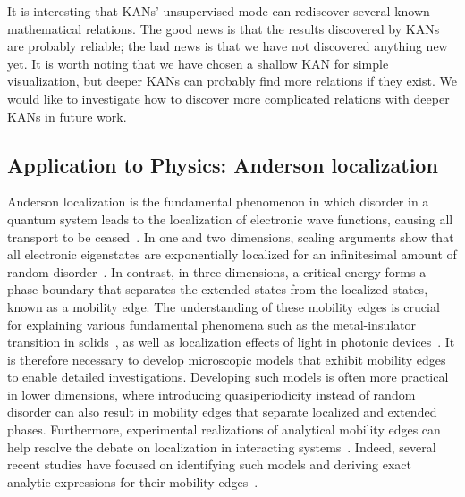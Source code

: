 \documentclass{article}
\numberwithin{equation}{section}
\numberwithin{figure}{section}
\begin{document}
It is interesting that KANs' unsupervised mode can rediscover several known mathematical relations. The good news is that the results discovered by KANs are probably reliable; the bad news is that we have not discovered anything new yet. It is worth noting that we have chosen a shallow KAN for simple visualization, but deeper KANs can probably find more relations if they exist. We would like to investigate how to discover more complicated relations with deeper KANs in future work. 

\subsection{Application to Physics: Anderson localization}\label{subsec:anderson}

Anderson localization is the fundamental phenomenon in which disorder in a quantum system leads to the localization of electronic wave functions, causing all transport to be ceased~\cite{anderson1958absence}. In one and two dimensions, scaling arguments show that all electronic eigenstates are exponentially localized for an infinitesimal amount of random disorder~\cite{thouless1972relation, abrahams1979scaling}. In contrast, in three dimensions, a critical energy forms a phase boundary that separates the extended states from the localized states, known as a mobility edge. The understanding of these mobility edges is crucial for explaining various fundamental phenomena such as the metal-insulator transition in solids~\cite{lagendijk2009fifty}, as well as localization effects of light in photonic devices~\cite{segev2013anderson, vardeny2013optics, john1987strong, lahini2009observation, vaidya2023reentrant}. It is therefore necessary to develop microscopic models that exhibit mobility edges to enable detailed investigations. Developing such models is often more practical in lower dimensions, where introducing quasiperiodicity instead of random disorder can also result in mobility edges that separate localized and extended phases. Furthermore, experimental realizations of analytical mobility edges can help resolve the debate on localization in interacting systems~\cite{de2016absence, li2015many}. Indeed, several recent studies have focused on identifying such models and deriving exact analytic expressions for their mobility edges~\cite{ME_an2021interactions, ME_biddle2010predicted, ME_duthie2021self, ME_ganeshan2015nearest, ME_wang2020one, ME_wang2021duality, ME_zhou2023exact}.
\end{document}
